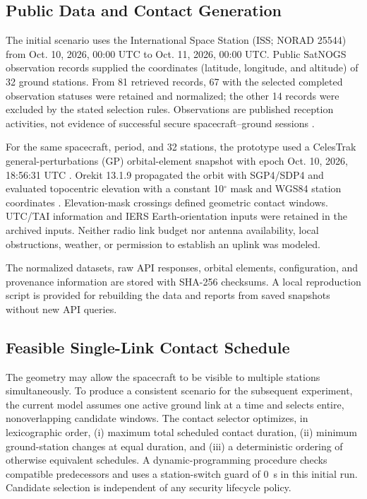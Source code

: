 \documentclass[conference]{IEEEtran}
\begin{document}
\subsection{Public Data and Contact Generation}
The initial scenario uses the International Space Station (ISS; NORAD 25544) from Oct. 10, 2026, 00:00 UTC to Oct. 11, 2026, 00:00 UTC. Public SatNOGS observation records supplied the coordinates (latitude, longitude, and altitude) of 32 ground stations. From 81 retrieved records, 67 with the selected completed observation statuses were retained and normalized; the other 14 records were excluded by the stated selection rules. Observations are published reception activities, not evidence of successful secure spacecraft--ground sessions \cite{ref22}.

For the same spacecraft, period, and 32 stations, the prototype used a CelesTrak general-perturbations (GP) orbital-element snapshot with epoch Oct. 10, 2026, 18:56:31 UTC \cite{ref23}. Orekit 13.1.9 propagated the orbit with SGP4/SDP4 and evaluated topocentric elevation with a constant 10$^\circ$ mask and WGS84 station coordinates \cite{ref24}. Elevation-mask crossings defined geometric contact windows. UTC/TAI information and IERS Earth-orientation inputs were retained in the archived inputs. Neither radio link budget nor antenna availability, local obstructions, weather, or permission to establish an uplink was modeled.

The normalized datasets, raw API responses, orbital elements, configuration, and provenance information are stored with SHA-256 checksums. A local reproduction script is provided for rebuilding the data and reports from saved snapshots without new API queries.

\subsection{Feasible Single-Link Contact Schedule}
The geometry may allow the spacecraft to be visible to multiple stations simultaneously. To produce a consistent scenario for the subsequent experiment, the current model assumes one active ground link at a time and selects entire, nonoverlapping candidate windows. The contact selector optimizes, in lexicographic order, (i) maximum total scheduled contact duration, (ii) minimum ground-station changes at equal duration, and (iii) a deterministic ordering of otherwise equivalent schedules. A dynamic-programming procedure checks compatible predecessors and uses a station-switch guard of 0~s in this initial run. Candidate selection is independent of any security lifecycle policy.
\end{document}

